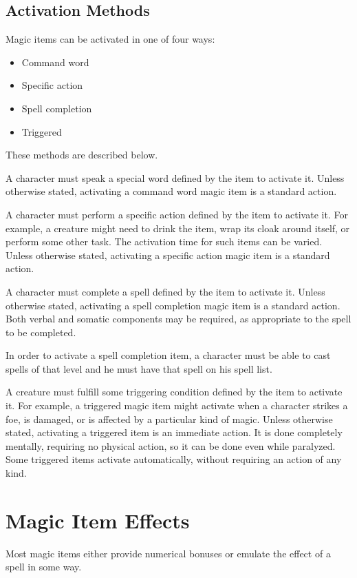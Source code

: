 \subsection{Activation Methods}
Magic items can be activated in one of four ways:

\begin{itemize}
    \item Command word
    \item Specific action
    \item Spell completion
    \item Triggered
\end{itemize}

These methods are described below.

 A character must speak a special word defined by the item to activate it.
Unless otherwise stated, activating a command word magic item is a standard action.

 A character must perform a specific action defined by the item to activate it.
For example, a creature might need to drink the item, wrap its cloak around itself, or perform some other task.
The activation time for such items can be varied.
Unless otherwise stated, activating a specific action magic item is a standard action.

 A character must complete a spell defined by the item to activate it.
Unless otherwise stated, activating a spell completion magic item is a standard action.
Both verbal and somatic components may be required, as appropriate to the spell to be completed.

In order to activate a spell completion item, a character must be able to cast spells of that level and he must have that spell on his spell list.

 A creature must fulfill some triggering condition defined by the item to activate it.
For example, a triggered magic item might activate when a character strikes a foe, is damaged, or is affected by a particular kind of magic.
Unless otherwise stated, activating a triggered item is an immediate action.
It is done completely mentally, requiring no physical action, so it can be done even while paralyzed.
Some triggered items activate automatically, without requiring an action of any kind.

\section{Magic Item Effects}
Most magic items either provide numerical bonuses or emulate the effect of a spell in some way.

